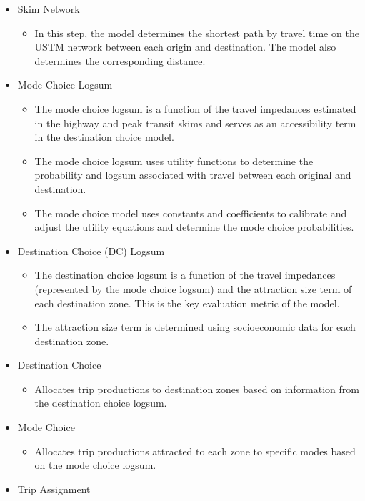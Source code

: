 \begin{itemize}
	\item Skim Network
		\begin{itemize}
			\item In this step, the model determines the shortest path by travel time on the USTM network between each origin and destination. The model also determines the corresponding distance.
		\end{itemize}
	\item Mode Choice Logsum
		\begin{itemize}
			\item The mode choice logsum is a function of the travel impedances estimated in the highway and peak transit skims and serves as an accessibility term in the destination choice model.
			\item The mode choice logsum uses utility functions to determine the probability and logsum associated with travel between each original and destination.
			\item The mode choice model uses constants and coefficients to calibrate and adjust the utility equations and determine the mode choice probabilities.
		\end{itemize}
	\item Destination Choice (DC) Logsum
		\begin{itemize}
			\item The destination choice logsum is a function of the travel impedances (represented by the mode choice logsum) and the attraction size term of each destination zone. This is the key evaluation metric of the model.
			\item The attraction size term is determined using socioeconomic data for each destination zone.
		\end{itemize}
	\item Destination Choice
		\begin{itemize}
			\item Allocates trip productions to destination zones based on
      information from the destination choice logsum.
		\end{itemize}
	\item Mode Choice
		\begin{itemize}
			\item Allocates trip productions attracted to each zone to specific
      modes based on the mode choice logsum.
		\end{itemize}
	\item Trip Assignment
		\begin{itemize}

\end{itemize}
\end{itemize}
